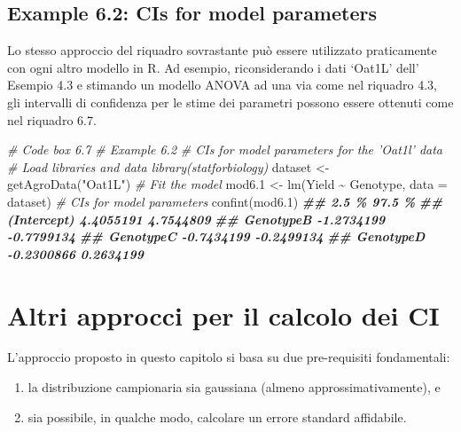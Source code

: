 \documentclass[
  12pt,
]{book}
\newenvironment{Shaded}{\begin{snugshade}}{\end{snugshade}}
\newcommand{\AttributeTok}[1]{\textcolor[rgb]{0.77,0.63,0.00}{#1}}
\newcommand{\CommentTok}[1]{\textcolor[rgb]{0.56,0.35,0.01}{\textit{#1}}}
\newcommand{\DocumentationTok}[1]{\textcolor[rgb]{0.56,0.35,0.01}{\textbf{\textit{#1}}}}
\newcommand{\FloatTok}[1]{\textcolor[rgb]{0.00,0.00,0.81}{#1}}
\newcommand{\FunctionTok}[1]{\textcolor[rgb]{0.00,0.00,0.00}{#1}}
\newcommand{\NormalTok}[1]{#1}
\newcommand{\OtherTok}[1]{\textcolor[rgb]{0.56,0.35,0.01}{#1}}
\newcommand{\SpecialCharTok}[1]{\textcolor[rgb]{0.00,0.00,0.00}{#1}}
\newcommand{\StringTok}[1]{\textcolor[rgb]{0.31,0.60,0.02}{#1}}
\providecommand{\tightlist}{%
  \setlength{\itemsep}{0pt}\setlength{\parskip}{0pt}}
\begin{document}
\hypertarget{example-6.2-cis-for-model-parameters}{%
\subsection{Example 6.2: CIs for model parameters}\label{example-6.2-cis-for-model-parameters}}

Lo stesso approccio del riquadro sovrastante può essere utilizzato praticamente con ogni altro modello in R. Ad esempio, riconsiderando i dati `Oat1L' dell' Esempio 4.3 e stimando un modello ANOVA ad una via come nel riquadro 4.3, gli intervalli di confidenza per le stime dei parametri possono essere ottenuti come nel riquadro 6.7.

\begin{Shaded}
\begin{Highlighting}[]
\CommentTok{\# Code box 6.7}
\CommentTok{\# Example 6.2}
\CommentTok{\# CIs for model parameters for the ’Oat1l’ data}
\CommentTok{\# Load libraries and data library(statforbiology)}
\NormalTok{dataset }\OtherTok{\textless{}{-}} \FunctionTok{getAgroData}\NormalTok{(}\StringTok{"Oat1L"}\NormalTok{)}
\CommentTok{\# Fit the model}
\NormalTok{mod6}\FloatTok{.1} \OtherTok{\textless{}{-}} \FunctionTok{lm}\NormalTok{(Yield }\SpecialCharTok{\textasciitilde{}}\NormalTok{ Genotype, }\AttributeTok{data =}\NormalTok{ dataset)}
\CommentTok{\# CIs for model parameters }
\FunctionTok{confint}\NormalTok{(mod6}\FloatTok{.1}\NormalTok{)}
\DocumentationTok{\#\#                  2.5 \%     97.5 \%}
\DocumentationTok{\#\# (Intercept)  4.4055191  4.7544809}
\DocumentationTok{\#\# GenotypeB   {-}1.2734199 {-}0.7799134}
\DocumentationTok{\#\# GenotypeC   {-}0.7434199 {-}0.2499134}
\DocumentationTok{\#\# GenotypeD   {-}0.2300866  0.2634199}
\end{Highlighting}
\end{Shaded}

\hypertarget{altri-approcci-per-il-calcolo-dei-ci}{%
\section{Altri approcci per il calcolo dei CI}\label{altri-approcci-per-il-calcolo-dei-ci}}

L'approccio proposto in questo capitolo si basa su due pre-requisiti fondamentali:

\begin{enumerate}
\def\labelenumi{\arabic{enumi}.}
\tightlist
\item
  la distribuzione campionaria sia gaussiana (almeno approssimativamente), e
\item
  sia possibile, in qualche modo, calcolare un errore standard affidabile.
\end{enumerate}
\end{document}

